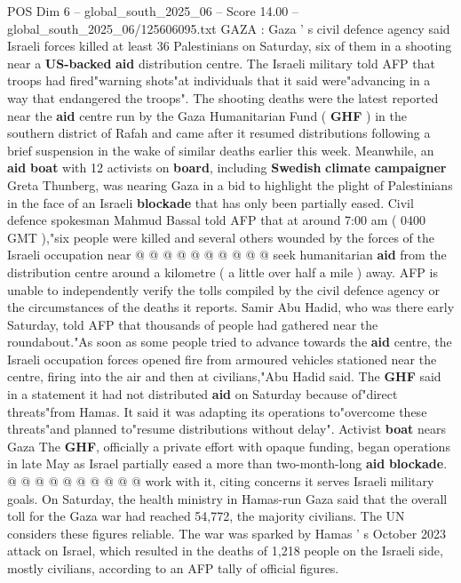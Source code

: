 \begin{textsample}{POS Dim 6 – global\_south\_2025\_06 – Score 14.00 – global\_south\_2025\_06/125606095.txt}  \label{ex:f6_pos_018}
GAZA : Gaza ' s civil defence agency said Israeli forces killed at least 36 Palestinians on Saturday, six of them in a shooting near a \textbf{US-backed} \textbf{aid} distribution centre.
The Israeli military told AFP that troops had fired"warning shots"at individuals that it said were"advancing in a way that endangered the troops".
The shooting deaths were the latest reported near the \textbf{aid} centre run by the Gaza Humanitarian Fund ( \textbf{GHF} ) in the southern district of Rafah and came after it resumed distributions following a brief suspension in the wake of similar deaths earlier this week.
Meanwhile, an \textbf{aid} \textbf{boat} with 12 activists on \textbf{board}, including \textbf{Swedish} \textbf{climate} \textbf{campaigner} Greta Thunberg, was nearing Gaza in a bid to highlight the plight of Palestinians in the face of an Israeli \textbf{blockade} that has only been partially eased.
Civil defence spokesman Mahmud Bassal told AFP that at around 7:00 am ( 0400 GMT ),"six people were killed and several others wounded by the forces of the Israeli occupation near @ @ @ @ @ @ @ @ @ @ seek humanitarian \textbf{aid} from the distribution centre around a kilometre ( a little over half a mile ) away.
AFP is unable to independently verify the tolls compiled by the civil defence agency or the circumstances of the deaths it reports.
Samir Abu Hadid, who was there early Saturday, told AFP that thousands of people had gathered near the roundabout."As soon as some people tried to advance towards the \textbf{aid} centre, the Israeli occupation forces opened fire from armoured vehicles stationed near the centre, firing into the air and then at civilians,"Abu Hadid said.
The \textbf{GHF} said in a statement it had not distributed \textbf{aid} on Saturday because of"direct threats"from Hamas.
It said it was adapting its operations to"overcome these threats"and planned to"resume distributions without delay".
Activist \textbf{boat} nears Gaza The \textbf{GHF}, officially a private effort with opaque funding, began operations in late May as Israel partially eased a more than two-month-long \textbf{aid} \textbf{blockade}. @ @ @ @ @ @ @ @ @ @ work with it, citing concerns it serves Israeli military goals.
On Saturday, the health ministry in Hamas-run Gaza said that the overall toll for the Gaza war had reached 54,772, the majority civilians.
The UN considers these figures reliable.
The war was sparked by Hamas ' s October 2023 attack on Israel, which resulted in the deaths of 1,218 people on the Israeli side, mostly civilians, according to an AFP tally of official figures.

\end{textsample}
